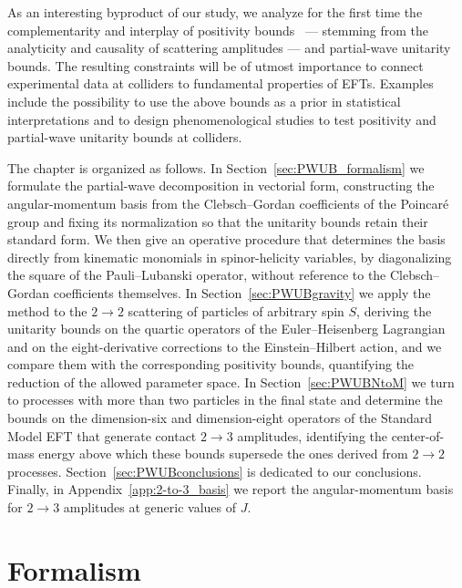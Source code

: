 As an interesting byproduct of our study, we analyze for the first time the complementarity and interplay of positivity bounds~\cite{Adams:2006sv} --- stemming from the analyticity and causality of scattering amplitudes --- and partial-wave unitarity bounds. The resulting constraints will be of utmost importance to connect experimental data at colliders to fundamental properties of EFTs. Examples include the possibility to 
use the above bounds as a prior in statistical interpretations and to design phenomenological studies to test positivity and partial-wave unitarity bounds at colliders.

The chapter is organized as follows. In Section~\ref{sec:PWUB_formalism} we formulate the partial-wave
decomposition in vectorial form, constructing the angular-momentum basis from the Clebsch--Gordan
coefficients of the Poincaré group and fixing its normalization so that the unitarity bounds retain
their standard form. We then give an operative procedure that determines the basis directly from
kinematic monomials in spinor-helicity variables, by diagonalizing the square of the Pauli--Lubanski
operator, without reference to the Clebsch--Gordan coefficients themselves. In
Section~\ref{sec:PWUBgravity} we apply the method to the $2\to 2$ scattering of particles of arbitrary
spin $S$, deriving the unitarity bounds on the quartic operators of the Euler--Heisenberg Lagrangian
and on the eight-derivative corrections to the Einstein--Hilbert action, and we compare them with the
corresponding positivity bounds, quantifying the reduction of the allowed parameter space. In
Section~\ref{sec:PWUBNtoM} we turn to processes with more than two particles in the final state and
determine the bounds on the dimension-six and dimension-eight operators of the Standard Model EFT that
generate contact $2\to 3$ amplitudes, identifying the center-of-mass energy above which these bounds
supersede the ones derived from $2\to 2$ processes. Section~\ref{sec:PWUBconclusions} is dedicated to our
conclusions. Finally, in Appendix~\ref{app:2-to-3_basis} we report the angular-momentum basis for
$2 \to 3$ amplitudes at generic values of $J$.

\section{Formalism\label{sec:PWUB_formalism}}

